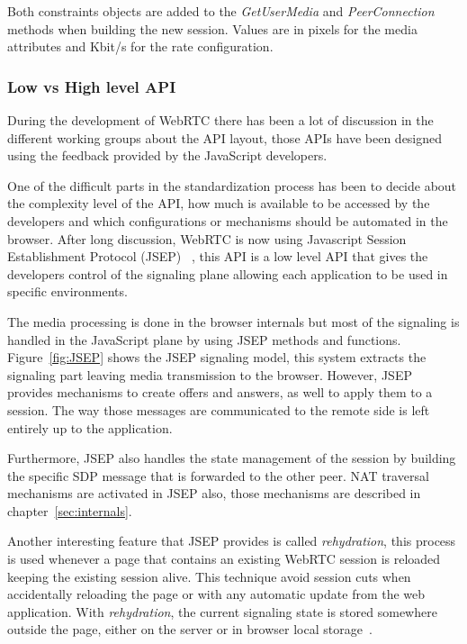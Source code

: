 Both constraints objects are added to the {\it GetUserMedia} and {\it PeerConnection} methods when building the new session. Values are in pixels for the media attributes and Kbit/s for the rate configuration.

\subsubsection{Low vs High level API}

During the development of WebRTC there has been a lot of discussion in the different working groups about the API layout, those APIs have been designed using the feedback provided by the JavaScript developers.

One of the difficult parts in the standardization process has been to decide about the complexity level of the API, how much is available to be accessed by the developers and which configurations or mechanisms should be automated in the browser. After long discussion, WebRTC is now using Javascript Session Establishment Protocol (JSEP) ~\cite{jsepIETF}, this API is a low level API that gives the developers control of the signaling plane allowing each application to be used in specific environments.


The media processing is done in the browser internals but most of the signaling is handled in the JavaScript plane by using JSEP methods and functions. Figure~\ref{fig:JSEP} shows the JSEP signaling model, this system extracts the signaling part leaving media transmission to the browser. However, JSEP provides mechanisms to create offers and answers, as well to apply them to a session. The way those messages are communicated to the remote side is left entirely up to the application.

Furthermore, JSEP also handles the state management of the session by building the specific SDP message that is forwarded to the other peer. NAT traversal mechanisms are activated in JSEP also, those mechanisms are described in chapter~\ref{sec:internals}.


Another interesting feature that JSEP provides is called {\it rehydration}, this process is used whenever a page that contains an existing WebRTC session is reloaded keeping the existing session alive. This technique avoid session cuts when accidentally reloading the page or with any automatic update from the web application. With {\it rehydration}, the current signaling state is stored somewhere outside the page, either on the server or in browser local storage~\cite{jsepIETF}.
 
